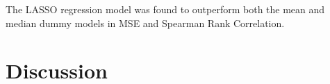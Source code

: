 \documentclass[12pt]{article}
\begin{document}
\vspace{-0.5cm}

The LASSO regression model was found to outperform both the mean and median dummy models in MSE and Spearman Rank Correlation.

\section{Discussion}

\newpage



\end{document}
